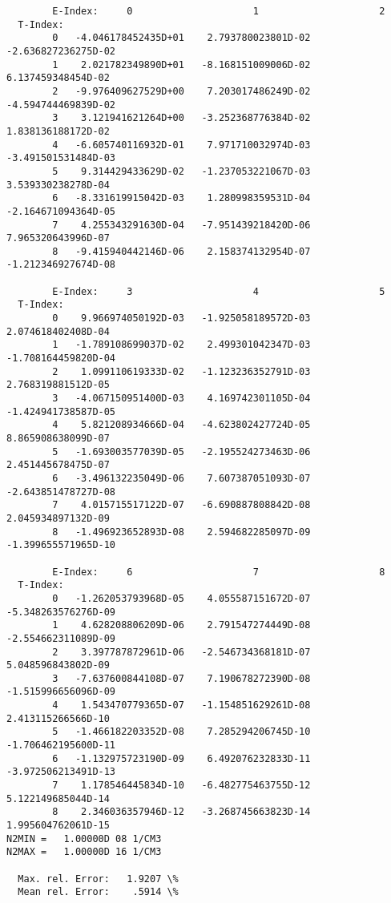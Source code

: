 \documentclass[12pt,dvipdfmx]{article}
\begin{document}
{\begin{small}
\begin{verbatim}
        E-Index:     0                     1                     2
  T-Index:
        0   -4.046178452435D+01    2.793780023801D-02   -2.636827236275D-02
        1    2.021782349890D+01   -8.168151009006D-02    6.137459348454D-02
        2   -9.976409627529D+00    7.203017486249D-02   -4.594744469839D-02
        3    3.121941621264D+00   -3.252368776384D-02    1.838136188172D-02
        4   -6.605740116932D-01    7.971710032974D-03   -3.491501531484D-03
        5    9.314429433629D-02   -1.237053221067D-03    3.539330238278D-04
        6   -8.331619915042D-03    1.280998359531D-04   -2.164671094364D-05
        7    4.255343291630D-04   -7.951439218420D-06    7.965320643996D-07
        8   -9.415940442146D-06    2.158374132954D-07   -1.212346927674D-08

        E-Index:     3                     4                     5
  T-Index:
        0    9.966974050192D-03   -1.925058189572D-03    2.074618402408D-04
        1   -1.789108699037D-02    2.499301042347D-03   -1.708164459820D-04
        2    1.099110619333D-02   -1.123236352791D-03    2.768319881512D-05
        3   -4.067150951400D-03    4.169742301105D-04   -1.424941738587D-05
        4    5.821208934666D-04   -4.623802427724D-05    8.865908638099D-07
        5   -1.693003577039D-05   -2.195524273463D-06    2.451445678475D-07
        6   -3.496132235049D-06    7.607387051093D-07   -2.643851478727D-08
        7    4.015715517122D-07   -6.690887808842D-08    2.045934897132D-09
        8   -1.496923652893D-08    2.594682285097D-09   -1.399655571965D-10

        E-Index:     6                     7                     8
  T-Index:
        0   -1.262053793968D-05    4.055587151672D-07   -5.348263576276D-09
        1    4.628208806209D-06    2.791547274449D-08   -2.554662311089D-09
        2    3.397787872961D-06   -2.546734368181D-07    5.048596843802D-09
        3   -7.637600844108D-07    7.190678272390D-08   -1.515996656096D-09
        4    1.543470779365D-07   -1.154851629261D-08    2.413115266566D-10
        5   -1.466182203352D-08    7.285294206745D-10   -1.706462195600D-11
        6   -1.132975723190D-09    6.492076232833D-11   -3.972506213491D-13
        7    1.178546445834D-10   -6.482775463755D-12    5.122149685044D-14
        8    2.346036357946D-12   -3.268745663823D-14    1.995604762061D-15
N2MIN =   1.00000D 08 1/CM3
N2MAX =   1.00000D 16 1/CM3

  Max. rel. Error:   1.9207 \%
  Mean rel. Error:    .5914 \%




\end{verbatim}
\end{small}}
\end{document}
